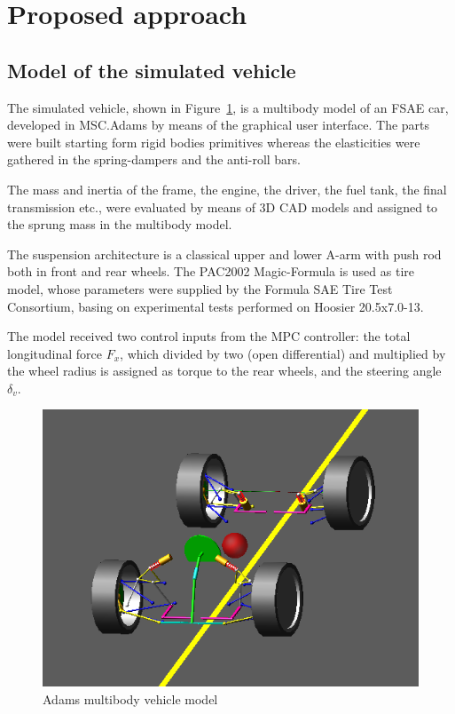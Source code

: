 \documentclass[conference]{IEEEtran} %
\begin{document}

\section{Proposed approach} %


\subsection{Model of the simulated vehicle}
The simulated vehicle, shown in Figure~\ref{fig:Adams_vehicle}, is a multibody model of an FSAE car, developed in MSC.Adams by means of the graphical user interface. The parts were built starting form rigid bodies primitives whereas the elasticities were gathered in the spring-dampers and the anti-roll bars. 

The mass and inertia of the frame, the engine, the driver, the fuel 
tank, the final transmission etc.,  were evaluated by means of 3D CAD models and
assigned to the sprung mass in the multibody model.

The suspension architecture is a classical upper and lower A-arm with push rod both in front and rear wheels. The PAC2002 Magic-Formula is used as tire model, whose parameters were supplied by the Formula SAE Tire Test Consortium, basing on experimental tests performed on Hoosier 20.5x7.0-13.

The model received two control inputs from the MPC controller: the total longitudinal force $F_{x}$, which divided by two (open differential) and multiplied by the wheel radius is assigned as torque to the rear wheels, and the steering angle $\delta_v$.

\begin{figure}[htb] \centering
	
	\includegraphics[width=0.8\linewidth]{adams_vehicle}
	
	\caption{Adams multibody vehicle model}
	
	\label{fig:Adams_vehicle}
	
\end{figure}
\end{document}
